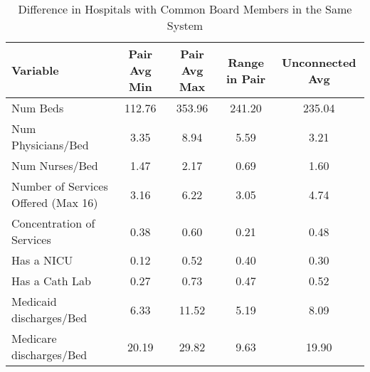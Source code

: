\begin{table}[ht!]
\centering
\caption{Difference in Hospitals with Common Board Members in the Same System}
\centering
\begin{tabular}[t]{lcccc}
\toprule
Variable & Pair Avg Min & Pair Avg Max & Range in Pair & Unconnected Avg\\
\midrule
Num Beds & 112.76 & 353.96 & 241.20 & 235.04\\
Num Physicians/Bed & 3.35 & 8.94 & 5.59 & 3.21\\
Num Nurses/Bed & 1.47 & 2.17 & 0.69 & 1.60\\
Number of Services Offered (Max 16) & 3.16 & 6.22 & 3.05 & 4.74\\
Concentration of Services & 0.38 & 0.60 & 0.21 & 0.48\\
\addlinespace
Has a NICU & 0.12 & 0.52 & 0.40 & 0.30\\
Has a Cath Lab & 0.27 & 0.73 & 0.47 & 0.52\\
Medicaid discharges/Bed & 6.33 & 11.52 & 5.19 & 8.09\\
Medicare discharges/Bed & 20.19 & 29.82 & 9.63 & 19.90\\
\bottomrule
\end{tabular}
\end{table}
